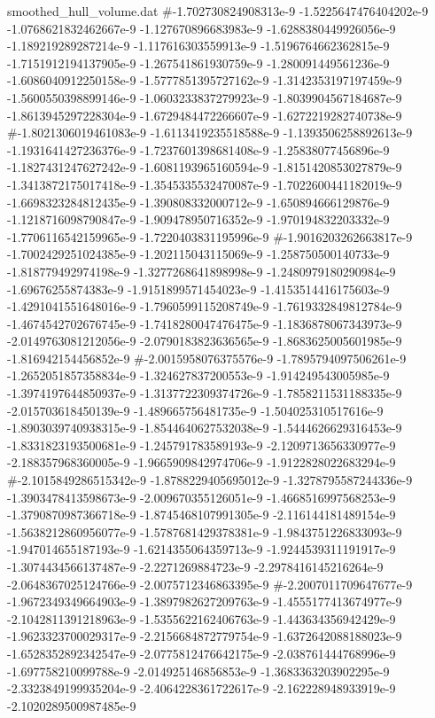 \begin{filecontents}{smoothed_hull_volume.dat}
#-1.702730824908313e-9	-1.5225647476404202e-9	-1.0768621832462667e-9	-1.127670896683983e-9	-1.6288380449926056e-9	-1.189219289287214e-9	-1.117616303559913e-9	-1.5196764662362815e-9	-1.7151912194137905e-9	-1.267541861930759e-9	-1.280091449561236e-9	-1.6086040912250158e-9	-1.5777851395727162e-9	-1.3142353197197459e-9	-1.5600550398899146e-9	-1.0603233837279923e-9	-1.8039904567184687e-9	-1.8613945297228304e-9	-1.6729484472266607e-9	-1.6272219282740738e-9
#-1.8021306019461083e-9	-1.6113419235518588e-9	-1.1393506258892613e-9	-1.1931641427236376e-9	-1.7237601398681408e-9	-1.25838077456896e-9	-1.1827431247627242e-9	-1.6081193965160594e-9	-1.8151420853027879e-9	-1.3413872175017418e-9	-1.3545335532470087e-9	-1.7022600441182019e-9	-1.6698323284812435e-9	-1.390808332000712e-9	-1.650894666129876e-9	-1.1218716098790847e-9	-1.909478950716352e-9	-1.970194832203332e-9	-1.7706116542159965e-9	-1.7220403831195996e-9
#-1.9016203262663817e-9	-1.7002429251024385e-9	-1.202115043115069e-9	-1.258750500140733e-9	-1.818779492974198e-9	-1.3277268641898998e-9	-1.2480979180290984e-9	-1.69676255874383e-9	-1.9151899571454023e-9	-1.4153514416175603e-9	-1.4291041551648016e-9	-1.7960599115208749e-9	-1.7619332849812784e-9	-1.4674542702676745e-9	-1.7418280047476475e-9	-1.1836878067343973e-9	-2.0149763081212056e-9	-2.0790183823636565e-9	-1.8683625005601985e-9	-1.816942154456852e-9
#-2.0015958076375576e-9	-1.7895794097506261e-9	-1.2652051857358834e-9	-1.324627837200553e-9	-1.914249543005985e-9	-1.3974197644850937e-9	-1.3137722309374726e-9	-1.7858211531188335e-9	-2.015703618450139e-9	-1.489665756481735e-9	-1.504025310517616e-9	-1.8903039740938315e-9	-1.8544640627532038e-9	-1.5444626629316453e-9	-1.8331823193500681e-9	-1.245791783589193e-9	-2.1209713656330977e-9	-2.188357968360005e-9	-1.9665909842974706e-9	-1.9122828022683294e-9
#-2.1015849286515342e-9	-1.8788229405695012e-9	-1.3278795587244336e-9	-1.3903478413598673e-9	-2.009670355126051e-9	-1.4668516997568253e-9	-1.3790870987366718e-9	-1.8745468107991305e-9	-2.116144181489154e-9	-1.5638212860956077e-9	-1.5787681429378381e-9	-1.9843751226833093e-9	-1.947014655187193e-9	-1.6214355064359713e-9	-1.9244539311191917e-9	-1.3074434566137487e-9	-2.2271269884723e-9	-2.2978416145216264e-9	-2.0648367025124766e-9	-2.0075712346863395e-9
#-2.2007011709647677e-9	-1.9672349349664903e-9	-1.3897982627209763e-9	-1.4555177413674977e-9	-2.1042811391218963e-9	-1.5355622162406763e-9	-1.443634356942429e-9	-1.9623323700029317e-9	-2.2156684872779754e-9	-1.6372642088188023e-9	-1.6528352892342547e-9	-2.0775812476642175e-9	-2.038761444768996e-9	-1.697758210099788e-9	-2.014925146856853e-9	-1.3683363203902295e-9	-2.3323849199935204e-9	-2.4064228361722617e-9	-2.162228948933919e-9	-2.1020289500987485e-9

\end{filecontents}
